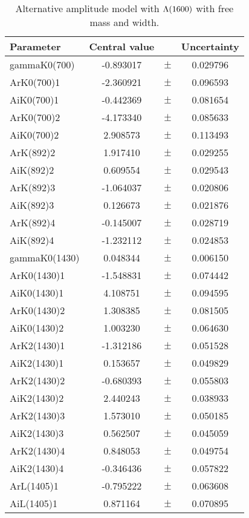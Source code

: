 \clearpage

\begin{table}
\centering
\caption{Alternative amplitude model with ${\Lambda}(1600)$ with free mass and width.}
\begin{tiny}
\begin{tabular}{lccc}
\toprule
Parameter & Central value & & Uncertainty\\
\midrule 
gammaK0(700) & -0.893017 & $\pm$ & 0.029796 \\
ArK0(700)1 & -2.360921 & $\pm$ & 0.096593 \\
AiK0(700)1 & -0.442369 & $\pm$ & 0.081654 \\
ArK0(700)2 & -4.173340 & $\pm$ & 0.085633 \\
AiK0(700)2 & 2.908573 & $\pm$ & 0.113493 \\
ArK(892)2 & 1.917410 & $\pm$ & 0.029255 \\
AiK(892)2 & 0.609554 & $\pm$ & 0.029543 \\
ArK(892)3 & -1.064037 & $\pm$ & 0.020806 \\
AiK(892)3 & 0.126673 & $\pm$ & 0.021876 \\
ArK(892)4 & -0.145007 & $\pm$ & 0.028719 \\
AiK(892)4 & -1.232112 & $\pm$ & 0.024853 \\
gammaK0(1430) & 0.048344 & $\pm$ & 0.006150 \\
ArK0(1430)1 & -1.548831 & $\pm$ & 0.074442 \\
AiK0(1430)1 & 4.108751 & $\pm$ & 0.094595 \\
ArK0(1430)2 & 1.308385 & $\pm$ & 0.081505 \\
AiK0(1430)2 & 1.003230 & $\pm$ & 0.064630 \\
ArK2(1430)1 & -1.312186 & $\pm$ & 0.051528 \\
AiK2(1430)1 & 0.153657 & $\pm$ & 0.049829 \\
ArK2(1430)2 & -0.680393 & $\pm$ & 0.055803 \\
AiK2(1430)2 & 2.440243 & $\pm$ & 0.038933 \\
ArK2(1430)3 & 1.573010 & $\pm$ & 0.050185 \\
AiK2(1430)3 & 0.562507 & $\pm$ & 0.045059 \\
ArK2(1430)4 & 0.848053 & $\pm$ & 0.049754 \\
AiK2(1430)4 & -0.346436 & $\pm$ & 0.057822 \\
ArL(1405)1 & -0.795222 & $\pm$ & 0.063608 \\
AiL(1405)1 & 0.871164 & $\pm$ & 0.070895 \\

\end{tabular}
\end{tiny}
\end{table}
